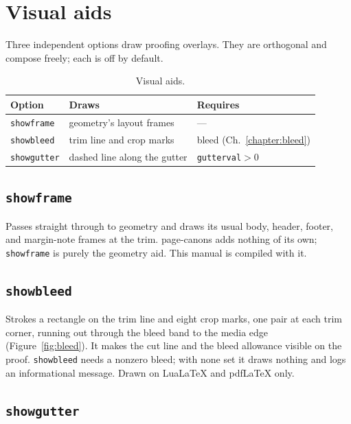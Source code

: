 \documentclass[11pt, twoside, openany]{book}
\newcommand{\pkg}[1]{\textsf{#1}}
\begin{document}
\chapter{Visual aids}\label{chapter:visualaids}

Three independent options draw proofing overlays. They are orthogonal and compose freely; each is off by default.

\begin{table}[h]
	\centering
	\caption{Visual aids.}
	\label{tab:visualaids}
	\begin{tabular}{@{}lll@{}}
		\toprule
		\textbf{Option}     & \textbf{Draws}                          & \textbf{Requires}            \\
		\midrule
		\texttt{showframe}  & \pkg{geometry}'s layout frames          & ---                          \\
		\texttt{showbleed}  & trim line and crop marks                & bleed (Ch.~\ref{chapter:bleed})  \\
		\texttt{showgutter} & dashed line along the gutter            & \texttt{gutterval}${}>0$     \\
		\bottomrule
	\end{tabular}
\end{table}

\section{\texttt{showframe}}\label{sec:showframe}

Passes straight through to \pkg{geometry} and draws its usual body, header, footer, and margin-note frames at the trim. \pkg{page-canons} adds nothing of its own; \texttt{showframe} is purely the \pkg{geometry} aid. This manual is compiled with it.

\section{\texttt{showbleed}}\label{sec:showbleed}

Strokes a rectangle on the trim line and eight crop marks, one pair at each trim corner, running out through the bleed band to the media edge (Figure~\ref{fig:bleed}). It makes the cut line and the bleed allowance visible on the proof. \texttt{showbleed} needs a nonzero bleed; with none set it draws nothing and logs an informational message. Drawn on Lua\LaTeX{} and pdf\LaTeX{} only.

\section{\texttt{showgutter}}\label{sec:showgutter}
\end{document}

